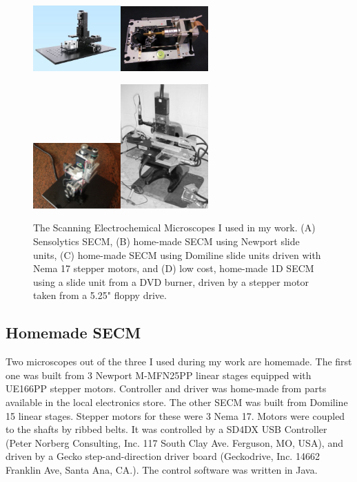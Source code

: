 \begin{figure}
\centering
\includegraphics[width=0.3\textwidth]{img/sensolytics.jpg}\includegraphics[width=0.3\textwidth]{img/diy_secm.jpg}

\includegraphics[width=0.3\textwidth]{img/agricom.jpg}\includegraphics[width=0.3\textwidth]{img/newport.eps}
\caption[The Scanning Electrochemical Microscopes I used in my work.]{The Scanning Electrochemical Microscopes I used in my work.
(A) Sensolytics SECM, (B) home-made SECM using Newport slide units, (C) home-made SECM using Domiline slide units driven with Nema 17 stepper motors, and (D) low cost, home-made 1D SECM using a slide unit from a DVD burner, driven by a stepper motor taken from a 5.25" floppy drive.}
\label{fig:secms}
\end{figure}

		\subsection{Homemade SECM}
Two microscopes out of the three I used during my work are homemade.
The first one was built from 3 Newport M-MFN25PP linear stages equipped with UE166PP stepper motors. 
Controller and driver was home-made from parts available in the local electronics store.
The other SECM was built from Domiline 15 linear stages.
Stepper motors for these were 3 Nema 17.
Motors were coupled to the shafts by ribbed belts.
It was controlled by a SD4DX USB Controller (Peter Norberg Consulting, Inc. 117 South Clay Ave. Ferguson, MO, USA), and driven by a Gecko step-and-direction driver board (Geckodrive, Inc. 14662 Franklin Ave, Santa Ana, CA.).
The control software was written in Java. 
